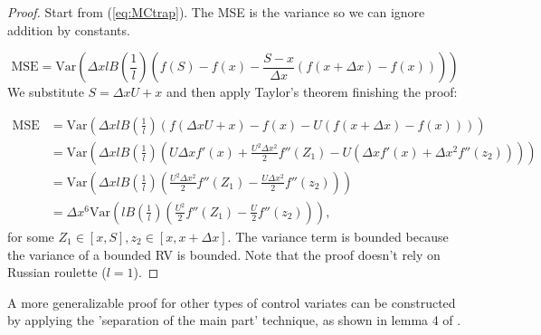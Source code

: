 \documentclass[a4paper,12pt]{article}
\begin{document}
\begin{proof}
    Start from (\ref{eq:MCtrap}). The MSE is the variance
    so we can ignore addition by constants.

    \begin{equation}
        \text{MSE} = \text{Var}\left( \Delta x l B\left( \frac{1}{l}\right)
        \left(f(S) - f(x) - \frac{S - x}{\Delta x}
        \left(f(x+\Delta x) - f(x)\right) \right)\right)
    \end{equation}
    We substitute $S = \Delta x U + x$ and then apply Taylor's theorem
    finishing the proof:

    \begin{align}
        \text{MSE} & = \text{Var}\left( \Delta x l B\left( \frac{1}{l}\right)
        \left(f(\Delta x U+x) - f(x) - U
        \left(f(x+\Delta x) - f(x)\right) \right)\right)                           \\
                   & = \text{Var}\left( \Delta x l B\left( \frac{1}{l}\right)
        \left( U \Delta x f'(x)+ \frac{U^{2} \Delta x ^{2}}{2} f''(Z_{1})
        - U \left( \Delta x f'(x) +
        \Delta x ^{2} f''(z_{2})\right) \right)\right)                             \\
                   & = \text{Var}\left( \Delta x l B\left( \frac{1}{l}\right)
        \left( \frac{U^{2} \Delta x ^{2}}{2} f''(Z_{1})
        -  \frac{U\Delta x ^{2}}{2} f''(z_{2}) \right)\right)                      \\
                   & =\Delta x ^{6} \text{Var}\left(  l B\left( \frac{1}{l}\right)
        \left( \frac{U^{2} }{2} f''(Z_{1})
        -  \frac{U}{2} f''(z_{2}) \right)\right),
    \end{align}
    for some $Z_{1} \in [x,S], z_{2} \in [x,x+\Delta x]$. The variance term is bounded
    because the variance of a bounded RV is bounded.
    Note that the proof doesn't rely on Russian roulette ($l=1$).
\end{proof}

\begin{related}
    A more generalizable proof for other types of control variates can
    be constructed by applying the 'separation of the main part' technique,
    as shown in lemma 4 of \cite{mathe_monte_nodate}.
\end{related}
\end{document}
